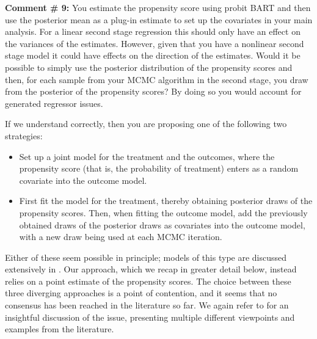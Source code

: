 \documentclass{article}
\begin{document}
\begin{mdframed}
    \textbf{Comment \# 9:} You estimate the propensity score using probit BART and then use the posterior mean as a plug-in estimate to set up the covariates in your main analysis. For a linear second stage regression this should only have an effect on the variances of the estimates. However, given that you have a nonlinear second stage model it could have effects on the direction of the estimates. Would it be possible to simply use the posterior distribution of the propensity scores and then, for each sample from your MCMC algorithm in the second stage, you draw from the posterior of the propensity scores? By doing so you would account for generated regressor issues.
\end{mdframed}

If we understand correctly, then you are proposing one of the following two strategies:
\begin{itemize}
    \item Set up a joint model for the treatment and the outcomes, where the propensity score (that is, the probability of treatment) enters as a random covariate into the outcome model.
    \item First fit the model for the treatment, thereby obtaining posterior draws of the propensity scores. Then, when fitting the outcome model, add the previously obtained draws of the posterior draws as covariates into the outcome model, with a new draw being used at each MCMC iteration.
\end{itemize}
Either of these seem possible in principle; models of this type are discussed extensively in \citet{li2023bayesian}. Our approach, which we recap in greater detail below, instead relies on a point estimate of the propensity scores. The choice between these three diverging approaches is a point of contention, and it seems that no consensus has been reached in the literature so far. We again refer to \citet{li2023bayesian} for an insightful discussion of the issue, presenting multiple different viewpoints and examples from the literature.
\end{document}
